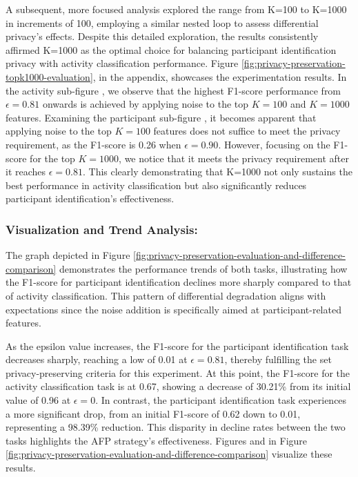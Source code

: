 \documentclass{l4proj}
\begin{document}
A subsequent, more focused analysis explored the range from K=100 to K=1000 in increments of 100, employing a similar nested loop to assess differential privacy's effects. Despite this detailed exploration, the results consistently affirmed K=1000 as the optimal choice for balancing participant identification privacy with activity classification performance. Figure \ref{fig:privacy-preservation-topk1000-evaluation}, in the appendix, showcases the experimentation results. 
In the activity sub-figure , we observe that the highest F1-score performance from $\epsilon=0.81$ onwards is achieved by applying noise to the top $K=100$ and $K=1000$ features. Examining the participant sub-figure , it becomes apparent that applying noise to the top $K=100$ features does not suffice to meet the privacy requirement, as the F1-score is 0.26 when $\epsilon=0.90$. However, focusing on the F1-score for the top $K=1000$, we notice that it meets the privacy requirement after it reaches $\epsilon=0.81$. This clearly demonstrating that K=1000 not only sustains the best performance in activity classification but also significantly reduces participant identification's effectiveness.

\subsubsection{Visualization and Trend Analysis:}
The graph depicted in Figure \ref{fig:privacy-preservation-evaluation-and-difference-comparison} demonstrates the performance trends of both tasks, illustrating how the F1-score for participant identification declines more sharply compared to that of activity classification. This pattern of differential degradation aligns with expectations since the noise addition is specifically aimed at participant-related features.

As the epsilon value increases, the F1-score for the participant identification task decreases sharply, reaching a low of 0.01 at $\epsilon = 0.81$, thereby fulfilling the set privacy-preserving criteria for this experiment. At this point, the F1-score for the activity classification task is at 0.67, showing a decrease of 30.21\% from its initial value of 0.96 at $\epsilon = 0$. In contrast, the participant identification task experiences a more significant drop, from an initial F1-score of 0.62 down to 0.01, representing a 98.39\% reduction. This disparity in decline rates between the two tasks highlights the AFP strategy's effectiveness. Figures  and  in Figure \ref{fig:privacy-preservation-evaluation-and-difference-comparison} visualize these results.
\end{document}
